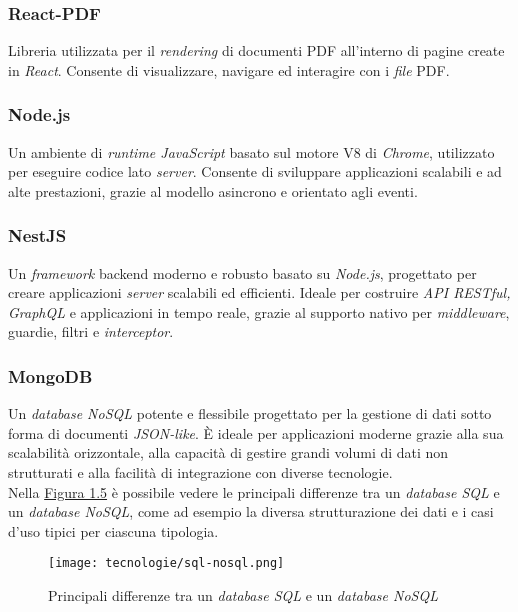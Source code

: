 \subsubsection{React-PDF}

Libreria utilizzata per il \textit{rendering} di documenti PDF all’interno di pagine create in \textit{React}.
Consente di visualizzare, navigare ed interagire con i \textit{file} PDF.

\subsubsection{Node.js}

Un ambiente di \textit{runtime JavaScript} basato sul motore V8 di \textit{Chrome}, utilizzato per eseguire codice lato \textit{server}. 
Consente di sviluppare applicazioni scalabili e ad alte prestazioni, grazie al modello asincrono e orientato agli eventi.

\subsubsection{NestJS}

Un \textit{framework} \gls{backend} moderno e robusto basato su \textit{Node.js}, progettato per creare applicazioni \textit{server} scalabili ed efficienti.
Ideale per costruire \textit{API RESTful, GraphQL} e applicazioni in tempo reale, grazie al supporto nativo per \textit{middleware}, guardie, filtri e \textit{interceptor}.

\subsubsection{MongoDB}

Un \textit{database NoSQL} potente e flessibile progettato per la gestione di dati sotto forma di documenti \textit{JSON-like}. 
È ideale per applicazioni moderne grazie alla sua scalabilità orizzontale, alla capacità di gestire grandi volumi di dati non strutturati e alla facilità di integrazione con diverse tecnologie. \\
Nella {\hyperref[fig:sql-nosql]{Figura 1.5}} è possibile vedere le principali differenze tra un \textit{database SQL} e un \textit{database NoSQL}, come ad esempio la diversa strutturazione dei dati
e i casi d'uso tipici per ciascuna tipologia.
\begin{figure}[H]
    \label{fig:sql-nosql}
    \centering
    \texttt{[image: tecnologie/sql-nosql.png]}
    \caption{Principali differenze tra un \textit{database SQL} e un \textit{database NoSQL}}
\end{figure}

